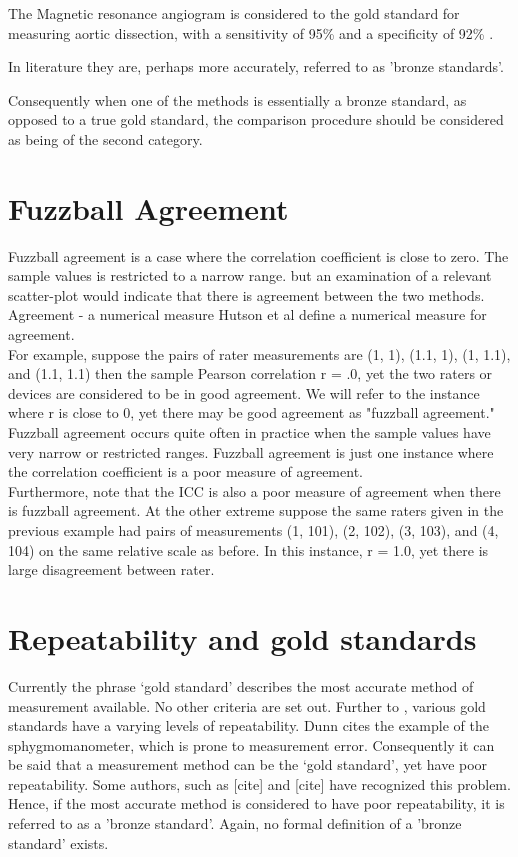 \documentclass[12pt, a4paper]{report}
\theoremstyle{plain}
\theoremstyle{definition}
\theoremstyle{remark}
\begin{document}
	The Magnetic resonance angiogram is considered to the gold
	standard for measuring aortic dissection, with a sensitivity of
	95\% and a specificity of 92\% . \citep{ACR}
	
	In literature they are, perhaps more accurately, referred to as 'bronze standards'.
	
	Consequently when one of the methods is essentially a bronze
	standard, as opposed to a true gold standard, the comparison
	procedure should be considered as being of the second category.
	
\newpage	\section{Fuzzball Agreement}
	Fuzzball agreement is a case where the correlation coefficient is close to zero. The sample values is restricted to a narrow range. but an examination of a relevant scatter-plot would indicate that
	there is agreement between the two methods.
	\\
	Agreement - a numerical measure Hutson et al define a numerical measure for agreement.
	\\
	For example, suppose the pairs of rater measurements are (1, 1), (1.1, 1), (1, 1.1), and (1.1, 1.1) then the sample Pearson correlation r = .0, yet the two raters or devices are considered to be in good agreement. We will refer to the instance where r is close to 0, yet there may be good agreement as "fuzzball agreement." \\Fuzzball agreement occurs quite often in practice when the sample values have very narrow or restricted ranges. Fuzzball agreement is just one instance where the correlation coefficient is a poor measure of agreement. \\Furthermore, note that the ICC is also a poor measure of agreement when there is fuzzball agreement. At the other extreme suppose the same raters given in the previous example had pairs of measurements (1, 101), (2, 102), (3, 103), and (4, 104) on the same relative scale as before. In this instance, r = 1.0, yet there is large disagreement between rater.
	

	\bigskip
\section{Repeatability and gold standards}
	Currently the phrase `gold standard' describes the most accurate method of measurement available. No other criteria are set out. Further to \citet{dunnSEME}, various gold standards have a varying levels of repeatability. Dunn cites the example of the sphygmomanometer, which is prone to measurement error. Consequently it can be said that a measurement method can be the `gold standard', yet have poor repeatability. Some authors, such as [cite] and [cite] have recognized this problem. Hence, if the most accurate method is considered to have poor repeatability, it is referred to as a 'bronze standard'.  Again, no formal definition of a 'bronze standard' exists.
	
\end{document}
